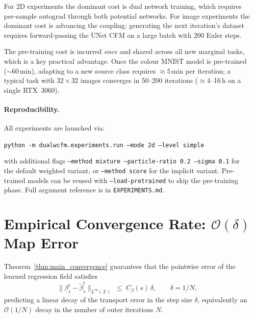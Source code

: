 \documentclass[11pt]{article}
\theoremstyle{definition}
\numberwithin{equation}{section}%
\begin{document}
For 2D experiments the dominant cost is dual network training, which
requires per-sample autograd through both potential networks.
For image experiments the dominant cost is advancing the coupling: generating
the next iteration's dataset requires forward-passing the UNet CFM on a
large batch with 200 Euler steps.

The pre-training cost is incurred \emph{once} and shared across all new
marginal tasks, which is a key practical advantage.
Once the colour MNIST model is pre-trained ($\sim$60\,min), adapting to a
new source class requires $\approx 5$\,min per iteration; a typical task
with $32\!\times\!32$ images converges in 50--200 iterations
($\approx 4$--16\,h on a single RTX~3060).

\paragraph{Reproducibility.}
All experiments are launched via:
\begin{center}
\texttt{python -m dualwcfm.experiments.run --mode 2d --level simple}
\end{center}
with additional flags \texttt{--method mixture --particle-ratio 0.2
--sigma 0.1} for the default weighted variant, or \texttt{--method score}
for the implicit variant.
Pre-trained models can be reused with \texttt{--load-pretrained} to skip
the pre-training phase.
Full argument reference is in \texttt{EXPERIMENTS.md}.

% 
\section{Empirical Convergence Rate: \texorpdfstring{$\mathcal{O}(\delta)$}{O(delta)} Map Error}
\label{app:convergence_rate}
% 

Theorem~\ref{thm:main_convergence} guarantees that the pointwise error of the
learned regression field satisfies
\begin{equation}
  \|\beta_s^t - \tilde{\beta}_s^t\|_{L^\infty(\mathcal{X})} \;\le\; C_\beta(s)\,\delta,
  \qquad \delta = 1/N,
\end{equation}
predicting a linear decay of the transport error in the step size $\delta$,
equivalently an $\mathcal{O}(1/N)$ decay in the number of outer iterations $N$.
\end{document}
